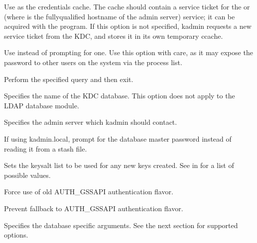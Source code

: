 \documentclass[letterpaper,10pt,english]{sphinxmanual}
\begin{document}
\begin{description}
\sphinxAtStartPar
Use  as the credentials cache.  The cache
should contain a service ticket for the  or
 (where  is the fully\sphinxhyphen{}qualified
hostname of the admin server) service; it can be acquired with the
 program.  If this option is not specified, kadmin
requests a new service ticket from the KDC, and stores it in its
own temporary ccache.

\sphinxAtStartPar
Use  instead of prompting for one.  Use this option with
care, as it may expose the password to other users on the system
via the process list.

\sphinxAtStartPar
Perform the specified query and then exit.

\sphinxAtStartPar
Specifies the name of the KDC database.  This option does not
apply to the LDAP database module.

\sphinxAtStartPar
Specifies the admin server which kadmin should contact.

\sphinxAtStartPar
If using kadmin.local, prompt for the database master password
instead of reading it from a stash file.

\sphinxAtStartPar
Sets the keysalt list to be used for any new keys created.  See
{\hyperref[\detokenize{admin/conf_files/kdc_conf:keysalt-lists}]{}} in {\hyperref[\detokenize{admin/conf_files/kdc_conf:kdc-conf-5}]{}} for a list of possible
values.

\sphinxAtStartPar
Force use of old AUTH\_GSSAPI authentication flavor.

\sphinxAtStartPar
Prevent fallback to AUTH\_GSSAPI authentication flavor.

\sphinxAtStartPar
Specifies the database specific arguments.  See the next section
for supported options.

\end{description}
\end{document}
